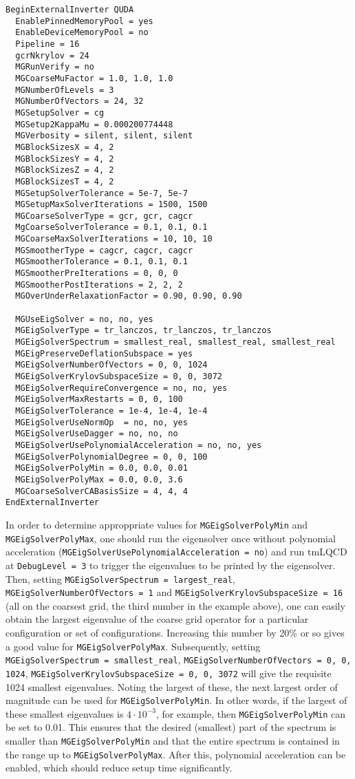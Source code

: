 \begin{verbatim}
BeginExternalInverter QUDA
  EnablePinnedMemoryPool = yes
  EnableDeviceMemoryPool = no
  Pipeline = 16
  gcrNkrylov = 24
  MGRunVerify = no
  MGCoarseMuFactor = 1.0, 1.0, 1.0
  MGNumberOfLevels = 3
  MGNumberOfVectors = 24, 32
  MGSetupSolver = cg
  MGSetup2KappaMu = 0.000200774448
  MGVerbosity = silent, silent, silent
  MGBlockSizesX = 4, 2
  MGBlockSizesY = 4, 2
  MGBlockSizesZ = 4, 2
  MGBlockSizesT = 4, 2
  MGSetupSolverTolerance = 5e-7, 5e-7
  MGSetupMaxSolverIterations = 1500, 1500
  MGCoarseSolverType = gcr, gcr, cagcr
  MgCoarseSolverTolerance = 0.1, 0.1, 0.1
  MGCoarseMaxSolverIterations = 10, 10, 10
  MGSmootherType = cagcr, cagcr, cagcr
  MGSmootherTolerance = 0.1, 0.1, 0.1
  MGSmootherPreIterations = 0, 0, 0
  MGSmootherPostIterations = 2, 2, 2
  MGOverUnderRelaxationFactor = 0.90, 0.90, 0.90

  MGUseEigSolver = no, no, yes
  MGEigSolverType = tr_lanczos, tr_lanczos, tr_lanczos
  MGEigSolverSpectrum = smallest_real, smallest_real, smallest_real
  MGEigPreserveDeflationSubspace = yes
  MGEigSolverNumberOfVectors = 0, 0, 1024
  MGEigSolverKrylovSubspaceSize = 0, 0, 3072
  MGEigSolverRequireConvergence = no, no, yes
  MGEigSolverMaxRestarts = 0, 0, 100
  MGEigSolverTolerance = 1e-4, 1e-4, 1e-4
  MGEigSolverUseNormOp  = no, no, yes
  MGEigSolverUseDagger = no, no, no
  MGEigSolverUsePolynomialAcceleration = no, no, yes
  MGEigSolverPolynomialDegree = 0, 0, 100
  MGEigSolverPolyMin = 0.0, 0.0, 0.01
  MGEigSolverPolyMax = 0.0, 0.0, 3.6
  MGCoarseSolverCABasisSize = 4, 4, 4
EndExternalInverter
\end{verbatim}

In order to determine approppriate values for \texttt{MGEigSolverPolyMin} and \texttt{MGEigSolverPolyMax}, one should run the eigensolver once without polynomial acceleration (\texttt{MGEigSolverUsePolynomialAcceleration = no}) and run tmLQCD at \texttt{DebugLevel = 3} to trigger the eigenvalues to be printed by the eigensolver.
Then, setting \texttt{MGEigSolverSpectrum = largest\_real}, \texttt{MGEigSolverNumberOfVectors = 1} and \texttt{MGEigSolverKrylovSubspaceSize = 16} (all on the coarsest grid, the third number in the example above), one can easily obtain the largest eigenvalue of the coarse grid operator for a particular configuration or set of configurations.
Increasing this number by 20\% or so gives a good value for \texttt{MGEigSolverPolyMax}.
Subsequently, setting \texttt{MGEigSolverSpectrum = smallest\_real}, \texttt{MGEigSolverNumberOfVectors = 0, 0, 1024}, \texttt{MGEigSolverKrylovSubspaceSize = 0, 0, 3072} will give the requisite 1024 smallest eigenvalues.
Noting the largest of these, the next largest order of magnitude can be used for \texttt{MGEigSolverPolyMin}.
In other words, if the largest of these smallest eigenvalues is $4\cdot10^{-3}$, for example, then \texttt{MGEigSolverPolyMin} can be set to 0.01.
This ensures that the desired (smallest) part of the spectrum is smaller than \texttt{MGEigSolverPolyMin} and that the entire spectrum is contained in the range up to \texttt{MGEigSolverPolyMax}.
After this, polynomial acceleration can be enabled, which should reduce setup time significantly.

